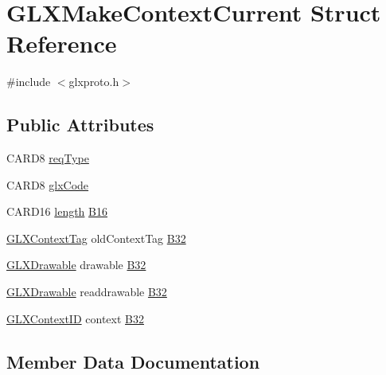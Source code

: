 \hypertarget{struct_g_l_x_make_context_current}{}\section{G\+L\+X\+Make\+Context\+Current Struct Reference}
\label{struct_g_l_x_make_context_current}


{\ttfamily \#include $<$glxproto.\+h$>$}

\subsection*{Public Attributes}
\begin{DoxyCompactItemize}
\item 
C\+A\+R\+D8 \hyperlink{struct_g_l_x_make_context_current_af39b09183a5646bd3f3fd509ab25b862}{req\+Type}
\item 
C\+A\+R\+D8 \hyperlink{struct_g_l_x_make_context_current_ac8fa1e1c922bc56dfbaaa0f6cef7d21c}{glx\+Code}
\item 
C\+A\+R\+D16 \hyperlink{glcorearb_8h_ab9c919755bde3b34349e23a32b4e0fa7}{length} \hyperlink{struct_g_l_x_make_context_current_a6a57fdc018253fc08074be697e1b5506}{B16}
\item 
\hyperlink{glxproto_8h_ae71763ce00c9fa460beb4699af678691}{G\+L\+X\+Context\+Tag} old\+Context\+Tag \hyperlink{struct_g_l_x_make_context_current_a4c5f45af2e2a0030581e45e92a7b97dd}{B32}
\item 
\hyperlink{glx_8h_a826f51745d9d6c81bdbac47ae2b80cf7}{G\+L\+X\+Drawable} drawable \hyperlink{struct_g_l_x_make_context_current_af2a06a28642b2695aab5b37b31eecf36}{B32}
\item 
\hyperlink{glx_8h_a826f51745d9d6c81bdbac47ae2b80cf7}{G\+L\+X\+Drawable} readdrawable \hyperlink{struct_g_l_x_make_context_current_a1a8e1750f93c54f80a5b4027f4ad1ae9}{B32}
\item 
\hyperlink{glx_8h_a17c7ca5b76cc448032df0b5352803005}{G\+L\+X\+Context\+ID} context \hyperlink{struct_g_l_x_make_context_current_a034a0504c9293baec3caf08a6e21a280}{B32}
\end{DoxyCompactItemize}


\subsection{Member Data Documentation}
\mbox{\label{struct_g_l_x_make_context_current_a6a57fdc018253fc08074be697e1b5506}} 
